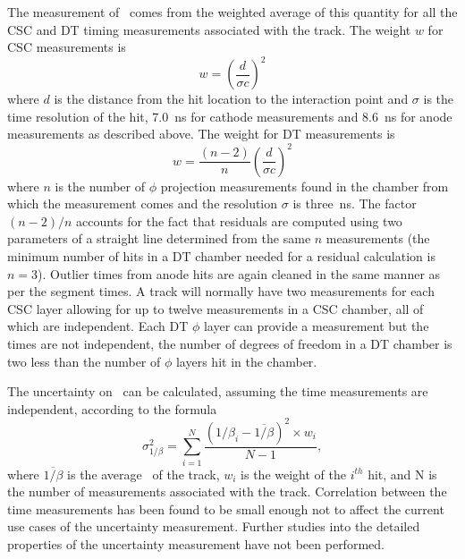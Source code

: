 The measurement of \invbeta\ comes from the weighted average of this quantity for all the
CSC and DT timing measurements associated with the track.
The weight $w$ for CSC measurements is
\begin{equation}
w = \left(\frac{d}{\sigma c}\right)^2
 \label{betaweight}
\end{equation}
where $d$ is the distance from the hit location to the interaction point
and $\sigma$ is the time resolution of the hit, 7.0~ns for cathode measurements and 8.6~ns for anode measurements as described above.
The weight for DT measurements is 
\begin{equation}
 w = \frac{(n-2)}{n}\left(\frac{d}{\sigma c}\right)^2
\end{equation}
where $n$ is the number of $\phi$ projection measurements found in the
chamber from which the measurement comes and the resolution $\sigma$ is three~ns.
The factor ${(n-2)/n}$ accounts for the fact that residuals are computed
using two parameters of a straight line determined from the same
$n$ measurements (the minimum number of hits in a DT chamber
needed for a residual calculation is $n=3$).
Outlier times from anode hits are again cleaned in the same manner as per the segment times. 
A track will normally have two measurements for each CSC layer allowing for up to twelve measurements in a CSC chamber, all of which are independent.
Each DT $\phi$ layer can provide a measurement but the times are not independent, the number of degrees of freedom in a DT chamber is two less than the number of $\phi$ layers
hit in the chamber.


The uncertainty on \invbeta\ can be calculated, assuming the time measurements are independent, according to the formula
\begin{equation}
 \sigma_{1/\beta}^{2} = \sum_{i=1}^N \frac{(1/\beta_i - \overline{1/\beta})^2 \times w_{i}}{N-1},
 \label{betaerr}
\end{equation}
where $\overline{1/\beta}$ is the average \invbeta\ of the track, $w_{i}$ is the weight of the $i^{th}$ hit, and N is the number of measurements associated with the track.
Correlation between the time measurements has been found to be small enough not to affect the current use cases of the uncertainty measurement.
Further studies into the detailed properties of the uncertainty measurement have not been performed.

